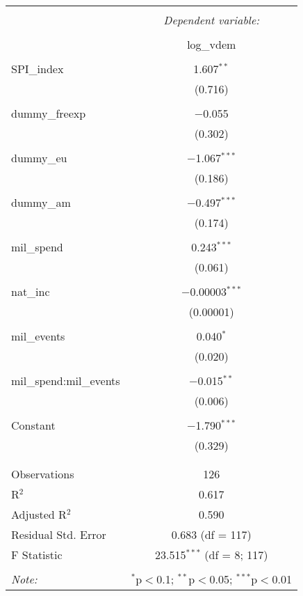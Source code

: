 
\begin{table}[!htbp] \centering 
  \caption{} 
  \label{} 
\begin{tabular}{@{\extracolsep{5pt}}lc} 
\\[-1.8ex]\hline 
\hline \\[-1.8ex] 
 & \multicolumn{1}{c}{\textit{Dependent variable:}} \\ 
\cline{2-2} 
\\[-1.8ex] & log\_vdem \\ 
\hline \\[-1.8ex] 
 SPI\_index & 1.607$^{**}$ \\ 
  & (0.716) \\ 
  & \\ 
 dummy\_freexp & $-$0.055 \\ 
  & (0.302) \\ 
  & \\ 
 dummy\_eu & $-$1.067$^{***}$ \\ 
  & (0.186) \\ 
  & \\ 
 dummy\_am & $-$0.497$^{***}$ \\ 
  & (0.174) \\ 
  & \\ 
 mil\_spend & 0.243$^{***}$ \\ 
  & (0.061) \\ 
  & \\ 
 nat\_inc & $-$0.00003$^{***}$ \\ 
  & (0.00001) \\ 
  & \\ 
 mil\_events & 0.040$^{*}$ \\ 
  & (0.020) \\ 
  & \\ 
 mil\_spend:mil\_events & $-$0.015$^{**}$ \\ 
  & (0.006) \\ 
  & \\ 
 Constant & $-$1.790$^{***}$ \\ 
  & (0.329) \\ 
  & \\ 
\hline \\[-1.8ex] 
Observations & 126 \\ 
R$^{2}$ & 0.617 \\ 
Adjusted R$^{2}$ & 0.590 \\ 
Residual Std. Error & 0.683 (df = 117) \\ 
F Statistic & 23.515$^{***}$ (df = 8; 117) \\ 
\hline 
\hline \\[-1.8ex] 
\textit{Note:}  & \multicolumn{1}{r}{$^{*}$p$<$0.1; $^{**}$p$<$0.05; $^{***}$p$<$0.01} \\ 
\end{tabular} 
\end{table} 
